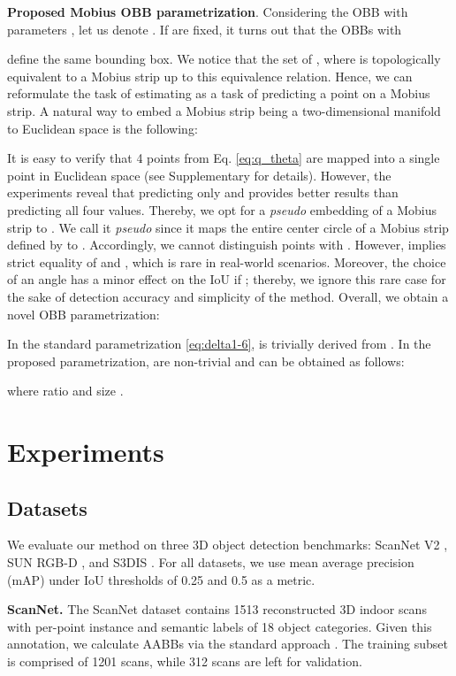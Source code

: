 \documentclass[runningheads]{llncs}
\begin{document}
\textbf{Proposed Mobius OBB parametrization}. Considering the OBB with parameters , let us denote . If  are fixed, it turns out that the OBBs with 

define the same bounding box.
We notice that the set of , where  is topologically equivalent to a Mobius strip \cite{munkres2000topology} up to this equivalence relation. Hence, we can reformulate the task of estimating  as a task of predicting a point on a Mobius strip. A natural way to embed a Mobius strip being a two-dimensional manifold to Euclidean space is the following: 

It is easy to verify that 4 points from Eq. \ref{eq:q_theta} are mapped into a single point in Euclidean space (see Supplementary for details). 
However, the experiments reveal that predicting only  and  provides better results than predicting all four values. Thereby, we opt for a \textit{pseudo} embedding of a Mobius strip to . We call it \textit{pseudo} since it maps the entire center circle of a Mobius strip defined by  to . Accordingly, we cannot distinguish points with . However,  implies strict equality of  and , which is rare in real-world scenarios. Moreover, the choice of an angle has a minor effect on the IoU if ; thereby, we ignore this rare case for the sake of detection accuracy and simplicity of the method. Overall, we obtain a novel OBB parametrization: 


In the standard parametrization \ref{eq:delta1-6},  is trivially derived from . In the proposed parametrization,  are non-trivial and can be obtained as follows:

where ratio  and size .

\section{Experiments}

\subsection{Datasets}

We evaluate our method on three 3D object detection benchmarks: ScanNet V2 \cite{dai2017scannet}, SUN RGB-D \cite{song2015sunrgbd}, and S3DIS \cite{armeni2016s3dis}. For all datasets, we use mean average precision (mAP) under IoU thresholds of 0.25 and 0.5 as a metric.

\textbf{ScanNet.} The ScanNet dataset contains 1513 reconstructed 3D indoor scans with per-point instance and semantic labels of 18 object categories. Given this annotation, we calculate AABBs via the standard approach \cite{qi2019votenet}. The training subset is comprised of 1201 scans, while 312 scans are left for validation.
\end{document}
